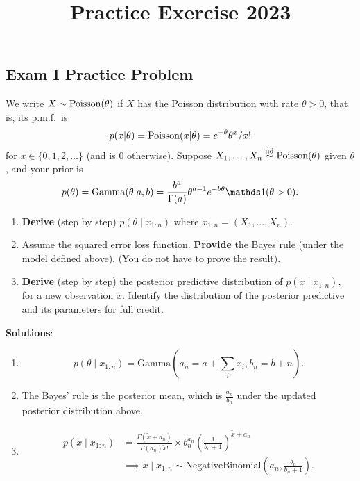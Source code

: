 \documentclass[12pt]{article}
\title{Practice Exercise 2023 }
\author{}
\date{}
\begin{document}
\maketitle



\subsection*{Exam I Practice Problem}
We write $X\sim\operatorname*{Poisson}(\theta)$ if $X$ has the Poisson distribution with rate $\theta>0$, that is, its p.m.f.\ is
$$ p(x|\theta) = \operatorname*{Poisson}(x|\theta)= e^{-\theta} \theta^x / x!$$
for $x\in\{0,1,2,\dotsc\}$ (and is $0$ otherwise). Suppose $X_1,\dotsc,X_n\stackrel{\mathrm{iid}}{\sim}\operatorname*{Poisson}(\theta)$ given $\theta$, and your prior is
$$ p(\theta) =\Ga(\theta|a,b) =\frac{b^a}{\Gamma(a)} \theta^{a-1} e^{-b\theta}\I(\theta>0) .$$

\vspace*{1em}

\begin{enumerate}
\item \textbf{Derive} (step by step) $p( \theta \mid x_{1:n} )$ where $x_{1:n} = (X_1,\dotsc,X_n).$
\item Assume the squared error loss function. \textbf{Provide} the Bayes rule (under the model defined above). (You do not have to prove the result).
\item \textbf{Derive} (step by step) the posterior predictive distribution of $p(\tilde{x} \mid x_{1:n}),$ for a new observation $\tilde{x}.$ Identify the distribution of the posterior predictive and its parameters for full credit. 
\end{enumerate}

\textbf{Solutions}:
\begin{enumerate}
\item $$p(\theta \mid x_{1:n}) = \text{Gamma}(a_n = a + \sum_i x_i, b_n = b + n).$$
\item The Bayes' rule is the posterior mean, which is $\frac{a_n}{b_n}$ under the updated posterior distribution above. 
\item 
\begin{align}
p(\tilde{x} \mid x_{1:n}) &= \frac{\Gamma(\tilde{x} + a_n)}
{\Gamma(a_n)\tilde{x}!} \times b_n^{a_n} (\frac{1}{b_n+1})^{\tilde{x} + a_n}\\
&\implies
\tilde{x} \mid x_{1:n} \sim \text{NegativeBinomial}(a_n, \frac{b_n}{b_n + 1}).
\end{align}
\end{enumerate}
\end{document}
